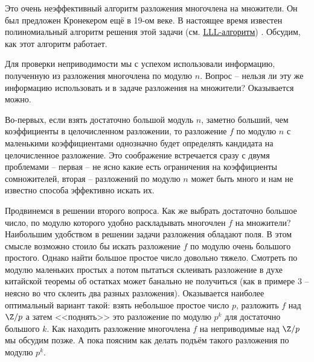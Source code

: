 Это очень неэффективный алгоритм разложения многочлена на множители. Он был предложен Кронекером ещё в 19-ом веке. В настоящее время известен полиномиальный алгоритм решения этой задачи (см. \href{http://www.math.leidenuniv.nl/%7Ehwl/PUBLICATIONS/1982f/art.pdf}{LLL-алгоритм}) \cite{LLL}. Обсудим, как этот алгоритм работает.

Для проверки неприводимости мы с успехом использовали информацию, полученную из разложения многочлена по модулю $n$. Вопрос -- нельзя ли эту же информацию использовать и в задаче разложения на множители? Оказывается можно.

Во-первых, если взять достаточно большой модуль $n$, заметно больший, чем коэффициенты в целочисленном разложении, то разложение $f$ по модулю $n$ с маленькими коэффициентами однозначно будет определять кандидата на целочисленное разложение. Это соображение встречается сразу с двумя проблемами -- первая -- не ясно какие есть ограничения на коэффициенты сомножителей, вторая -- разложений по модулю $n$ может быть много и нам не известно способа эффективно искать их.



Продвинемся в решении второго вопроса. Как же  выбрать достаточно большое число, по модулю которого удобно раскладывать многочлен $f$ на множители? Наибольшим удобством в решении задачи разложения обладают поля. В этом смысле возможно стоило бы искать разложение $f$ по модулю очень большого простого. Однако найти большое простое число довольно тяжело. Смотреть по модулю маленьких простых а потом пытаться склеивать разложение в духе китайской теоремы об остатках может банально не получиться (как в примере 3 -- неясно во что склеить два разных разложения). Оказывается наиболее оптимальный вариант такой: взять небольшое простое число $p$, разложить $f$ над $\Z/p$ а затем <<поднять>> это разложение по модулю $p^k$ для достаточно большого $k$. Как находить разложение многочлена $f$ на неприводимые над $\Z/p$ мы обсудим позже. А пока поясним как делать подъём такого разложения по модулю $p^k$.

